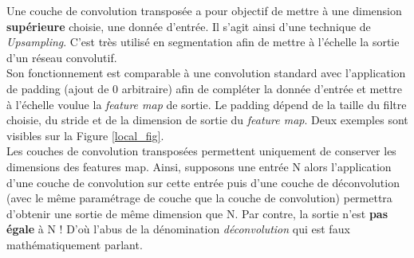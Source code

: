 \noindent Une couche de convolution transposée a pour objectif de mettre à une dimension \textbf{supérieure} choisie, une donnée d'entrée. Il s'agit ainsi d'une technique de \textit{Upsampling}. C'est très utilisé en segmentation afin de mettre à l'échelle la sortie d'un réseau convolutif.\\

\noindent Son fonctionnement est comparable à une convolution standard avec l'application de padding (ajout de 0 arbitraire) afin de compléter la donnée d'entrée et mettre à l'échelle voulue la \textit{feature map} de sortie. Le padding dépend de la taille du filtre choisie, du stride et de la dimension de sortie du \textit{feature map}. Deux exemples sont visibles sur la Figure \ref{local_fig}.\\

\noindent Les couches de convolution transposées permettent uniquement de conserver les dimensions des features map. Ainsi, supposons une entrée N alors l'application d'une couche de convolution sur cette entrée puis d'une couche de déconvolution (avec le même paramétrage de couche que la couche de convolution) permettra d'obtenir une sortie de même dimension que N. Par contre, la sortie n'est \textbf{pas égale} à N ! D'où l'abus de la dénomination \textit{déconvolution} qui est faux mathématiquement parlant.

